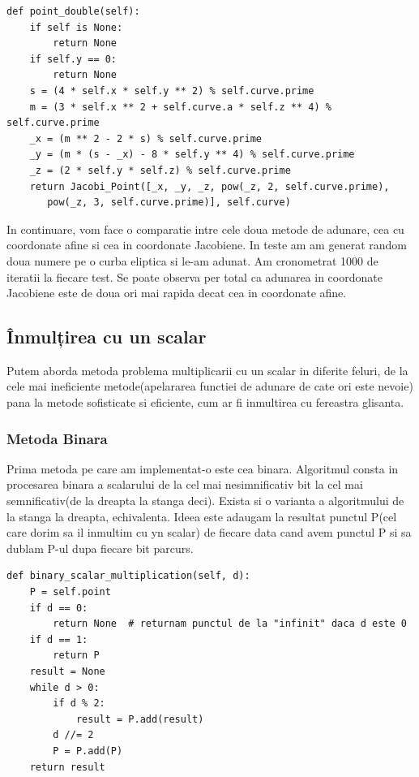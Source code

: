 \begin{lstlisting}
def point_double(self):
    if self is None:
        return None
    if self.y == 0:
        return None
    s = (4 * self.x * self.y ** 2) % self.curve.prime
    m = (3 * self.x ** 2 + self.curve.a * self.z ** 4) % self.curve.prime
    _x = (m ** 2 - 2 * s) % self.curve.prime
    _y = (m * (s - _x) - 8 * self.y ** 4) % self.curve.prime
    _z = (2 * self.y * self.z) % self.curve.prime
    return Jacobi_Point([_x, _y, _z, pow(_z, 2, self.curve.prime), 
	   pow(_z, 3, self.curve.prime)], self.curve)
\end{lstlisting}

In continuare, vom face o comparatie intre cele doua metode de adunare, cea cu coordonate afine si cea in coordonate Jacobiene. In teste am am generat random doua numere pe o curba eliptica si le-am adunat. Am cronometrat 1000 de iteratii la fiecare test. Se poate observa per total ca adunarea in coordonate Jacobiene este de doua ori mai rapida decat cea in coordonate afine.

\subsection{Înmulțirea cu un scalar}

Putem aborda metoda problema multiplicarii cu un scalar in diferite feluri, de la cele mai ineficiente metode(apelararea functiei de adunare de cate ori este nevoie) pana la metode sofisticate si eficiente, cum ar fi inmultirea cu fereastra glisanta.

\subsubsection{Metoda Binara}

Prima metoda pe care am implementat-o este cea binara. Algoritmul consta in procesarea binara a scalarului de la cel mai nesimnificativ bit la cel mai semnificativ(de la dreapta la stanga deci). Exista si o varianta a algoritmului de la stanga la dreapta, echivalenta. Ideea este adaugam la resultat punctul P(cel care dorim sa il inmultim cu yn scalar) de fiecare data cand avem punctul P si sa dublam P-ul dupa fiecare bit parcurs.

\begin{lstlisting}
def binary_scalar_multiplication(self, d):
    P = self.point
    if d == 0:
        return None  # returnam punctul de la "infinit" daca d este 0
    if d == 1:
        return P
    result = None
    while d > 0:
        if d % 2:
            result = P.add(result)
        d //= 2
        P = P.add(P)
    return result
\end{lstlisting}

